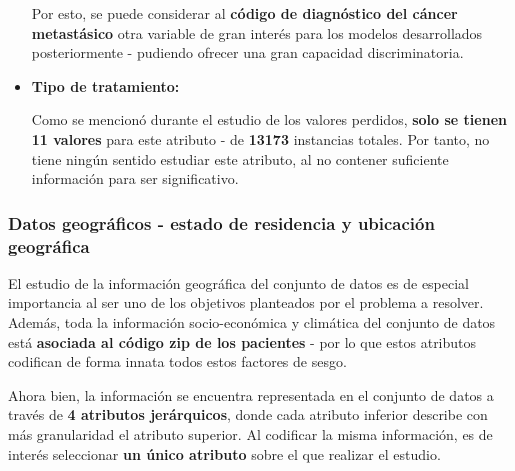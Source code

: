 \begin{itemize}[leftmargin=*]
	Por esto, se puede considerar al \textbf{código de diagnóstico del cáncer metastásico} otra variable de gran interés para los modelos desarrollados posteriormente - pudiendo ofrecer una gran capacidad discriminatoria.
	
	\item \textbf{Tipo de tratamiento:}
	
	Como se mencionó durante el estudio de los valores perdidos, \textbf{solo se tienen 11 valores} para este atributo - de \textbf{13173} instancias totales. Por tanto, no tiene ningún sentido estudiar este atributo, al no contener suficiente información para ser significativo.
\end{itemize}

\subsubsection{Datos geográficos - estado de residencia y ubicación geográfica}

El estudio de la información geográfica del conjunto de datos es de especial importancia al ser uno de los objetivos planteados por el problema a resolver. Además, toda la información socio-económica y climática del conjunto de datos está \textbf{asociada al código zip de los pacientes} - por lo que estos atributos codifican de forma innata todos estos factores de sesgo.

Ahora bien, la información se encuentra representada en el conjunto de datos a través de \textbf{4 atributos jerárquicos}, donde cada atributo inferior describe con más granularidad el atributo superior. Al codificar la misma información, es de interés seleccionar \textbf{un único atributo} sobre el que realizar el estudio.

